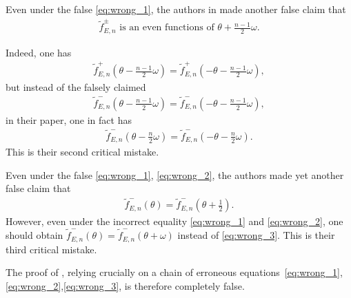 \documentclass[11pt]{amsart}
\begin{document}
Even under the false \eqref{eq:wrong_1}, the authors in \cite{BGW} made another false claim that \begin{align}\label{eq:wrong_2}
\tilde{f}_{E,n}^{\pm} \text{ is an even functions of }\theta+\frac{n-1}{2}\omega.
\end{align} 

Indeed, one has
\begin{align}\label{eq:f+_even}
    \tilde{f}_{E,n}^+(\theta-\frac{n-1}{2}\omega)=\tilde{f}_{E,n}^+(-\theta-\frac{n-1}{2}\omega),
\end{align} 
but instead of the falsely claimed
\begin{align}\label{eq:f-_even_wrong}
    \tilde{f}_{E,n}^-(\theta-\frac{n-1}{2}\omega)=\tilde{f}_{E,n}^-(-\theta-\frac{n-1}{2}\omega),
\end{align}
in their paper, one in fact has
\begin{align}\label{eq:f-_even}
    \tilde{f}_{E,n}^-(\theta-\frac{n}{2}\omega)=\tilde{f}_{E,n}^-(-\theta-\frac{n}{2}\omega).
\end{align}
This is their second critical mistake. 

Even under the false \eqref{eq:wrong_1}, \eqref{eq:wrong_2}, the authors made yet another false claim that
\begin{align}\label{eq:wrong_3}
\tilde{f}_{E,n}^-(\theta)=\tilde{f}_{E,n}^-(\theta+\frac{1}{2}).
\end{align}
However, even under the incorrect equality \eqref{eq:wrong_1} and \eqref{eq:wrong_2}, one should obtain $\tilde{f}_{E,n}^-(\theta)=\tilde{f}^-_{E,n}(\theta+\omega)$ instead of \eqref{eq:wrong_3}.
This is their third critical mistake.

The proof of \cite[Theorem 2]{BGW}, relying crucially on a chain of erroneous equations~\eqref{eq:wrong_1},\eqref{eq:wrong_2},\eqref{eq:wrong_3}, is therefore completely false.
\end{document}
